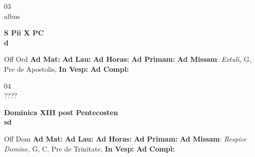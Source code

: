 \documentclass[10pt, openany]{book}
\begin{document}
    \begin{center}
        \begin{minipage}{3.5in}
            \vspace{2em}
            \begin{minipage}{0.5in}
                {\Huge 03} \\
                {\normalsize albus}
            \end{minipage}
            \begin{minipage}{3.0in}
                \textbf{ \large S Pii X PC \\
                \textnormal{\normalsize d}}

            \end{minipage}
            \begin{justify}Off Ord
                \textbf{Ad Mat: }
                \textbf{Ad Lau: }
                \textbf{Ad Horas: }
                \textbf{Ad Primam: }\textbf{Ad Missam}: \textit{Extuli,} G, Pre de Apostolis, 
                \textbf{In Vesp: }
                \textbf{Ad Compl: }
            \end{justify}
        \end{minipage}
    \end{center}

    \begin{center}
        \begin{minipage}{3.5in}
            \vspace{2em}
            \begin{minipage}{0.5in}
                {\Huge 04} \\
                {\normalsize ????}
            \end{minipage}
            \begin{minipage}{3.0in}
                \textbf{ \large Dominica XIII post Pentecosten \\
                \textnormal{\normalsize sd}}

            \end{minipage}
            \begin{justify}Off Dom
                \textbf{Ad Mat: }
                \textbf{Ad Lau: }
                \textbf{Ad Horas: }
                \textbf{Ad Primam: }\textbf{Ad Missam}: \textit{Respice Domine,} G, C, Pre de Trinitate, 
                \textbf{In Vesp: }
                \textbf{Ad Compl: }
            \end{justify}
        \end{minipage}
    \end{center}
\end{document}
